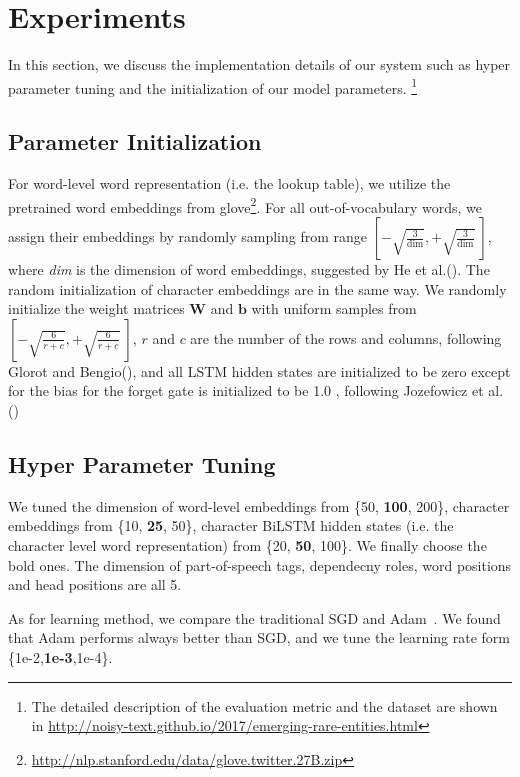\section{Experiments}
\label{sec:eval}
In this section, we discuss the implementation details of our system such as hyper parameter tuning and the initialization of our model parameters. 
\footnote{The detailed description of the evaluation metric and the dataset are shown in \url{http://noisy-text.github.io/2017/emerging-rare-entities.html}}
\subsection{Parameter Initialization}
For word-level word representation (i.e. the lookup table), 
we utilize the pretrained word embeddings from glove\footnote{\url{http://nlp.stanford.edu/data/glove.twitter.27B.zip}}.
For all out-of-vocabulary words, we assign their embeddings by randomly sampling from range $\left[-\sqrt{\frac{3}{\text{dim}}}, +\sqrt{\frac{3}{\text{dim}}}~\right]$, where \textit{dim} is the dimension of word embeddings, suggested by He et al.(\citeyear{DBLP:conf/iccv/HeZRS15}). The random initialization of character embeddings are in the same way.
We randomly initialize the weight matrices $\mathbf{W}$ and $\mathbf{b}$ with uniform samples from 
$\left[-\sqrt{\frac{6}{r+c}}, +\sqrt{\frac{6}{r+c}}~\right]$, 
$r$ and $c$ are the number of the rows and columns, following Glorot and Bengio(\citeyear{DBLP:journals/jmlr/GlorotB10}), and all LSTM hidden states are initialized to be zero except for the bias for the forget gate is initialized to be 1.0 , following Jozefowicz et al.(\citeyear{DBLP:conf/icml/JozefowiczZS15}) 


\subsection{Hyper Parameter Tuning}
We tuned the dimension of word-level embeddings from \{50, \textbf{100}, 200\}, character embeddings from \{10, \textbf{25}, 50\}, character BiLSTM hidden states (i.e. the character level word representation)  from  \{20, \textbf{50}, 100\}. 
We finally choose the bold ones.
The dimension of part-of-speech tags, dependecny roles, word positions and head positions are all 5.

As for learning method, we compare the traditional SGD and Adam~\cite{kingma2014adam}.
We found that Adam performs always better than SGD, and we tune the learning rate form \{1e-2,\textbf{1e-3},1e-4\}.


